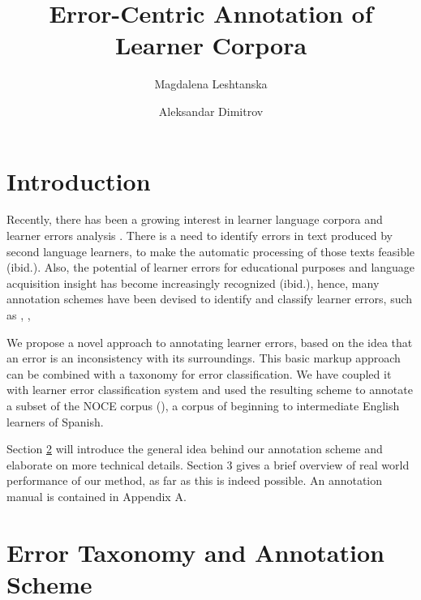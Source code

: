 \documentclass[12pt]{article}
\author{Magdalena Leshtanska \and Aleksandar Dimitrov}
\title{Error-Centric Annotation of Learner Corpora}
\begin{document}
\maketitle

\newtheorem{thm}{Theorem}[section]
\newtheorem{definition}[thm]{Definition}

\tableofcontents
{}

\section{Introduction}\label{sec:intro}

Recently, there has been a growing interest in learner language corpora and
learner errors analysis \cite{nessel}. There is a need to identify errors in
text produced by second language learners, to make the automatic processing of
those texts feasible (ibid.). Also, the potential of learner errors for
educational purposes and language acquisition insight has become increasingly
recognized (ibid.), hence, many annotation schemes have been devised to
identify and classify learner errors, such as \cite{negrillo}, \cite{CLC},
\cite{ludeling}

We propose a novel approach to annotating learner errors, based on the idea that
an error is an inconsistency with its surroundings. This basic markup approach
can be  combined with a taxonomy for error classification. We
have coupled it with learner error  classification system and used the resulting
scheme to annotate a subset of the NOCE corpus (\cite{negrilloph}), a corpus of
beginning to intermediate English learners of Spanish.

Section \ref{sec:scheme} will introduce the general idea behind our annotation
scheme and elaborate on more technical details. Section 3  gives a brief
overview of real world performance of our method, as far as this is indeed
possible. An annotation manual is contained in Appendix A.

\section{Error Taxonomy and Annotation Scheme}\label{sec:scheme}
\end{document}
